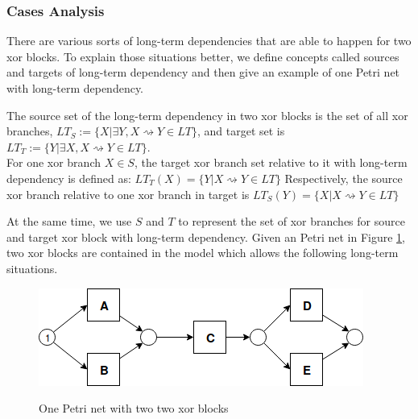 \subsubsection{Cases Analysis}
There are various sorts of long-term dependencies that are able to happen for two xor blocks. To explain those situations better, we define concepts called sources and targets of long-term dependency and then give an example of one Petri net with long-term dependency.
\begin{definition}
	The source set of the long-term dependency in two xor blocks is the set of all  xor branches, $LT_S:= \{X \vert \exists Y, X\rightsquigarrow Y  \in LT \} $, and target set is $LT_T:= \{Y \vert \exists X, X\rightsquigarrow Y \in LT \} $. \\
	For one xor branch $X \in S$, the target xor branch set relative to it with long-term dependency is defined as:
	$ LT_T(X)= \{Y \vert  X\rightsquigarrow Y \in LT \}$
	Respectively, the source xor branch relative to one xor branch in target is
	$ LT_S(Y)= \{X \vert  X\rightsquigarrow Y \in LT \}$
\end{definition}
At the same time, we use $S $ and $T$ to represent the set of xor branches for source and target xor block with long-term dependency.
Given an Petri net in Figure \ref{fig:seq-2-original}, two xor blocks are contained in the model which allows the following long-term situations.
\begin{figure}
	\centering
	\includegraphics[width=\linewidth]{figures/algorithm/LT_Seq_01_Original.png}
	\label{fig:seq-2-original}
	\caption{One Petri net with two two xor blocks}
\end{figure}
